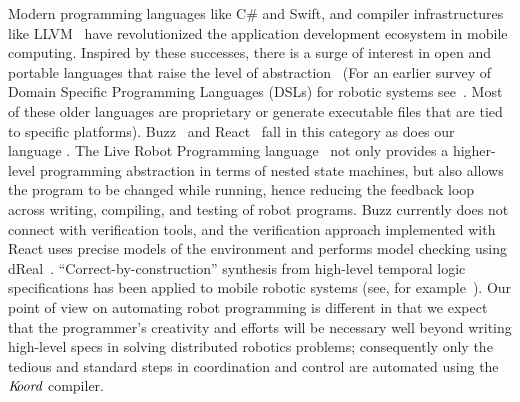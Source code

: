 Modern programming languages like C\# and Swift, and   compiler infrastructures like LLVM~\cite{llvm} have revolutionized the application development ecosystem in mobile computing.
Inspired by these successes, there is a surge of interest in open and portable languages that raise the level of abstraction~\cite{Buzzlanguage,Bohrer:2018:VVC:3192366.3192406,reactlang,williams2003model} (For an earlier survey of Domain Specific Programming Languages (DSLs) for robotic systems see~\cite{Nordmann2014}. Most of these older languages are proprietary or generate executable files that are tied to specific platforms).
%
Buzz~\cite{Buzzlanguage} and React~\cite{reactlang} fall in this category as does our language \lgname.
The Live Robot Programming language~\cite{campusanofabry:lrp2016} not only provides a higher-level programming abstraction in terms of nested state machines, but also allows the program to be changed while running, hence reducing the feedback loop across writing, compiling, and testing of robot programs.
Buzz currently does not  connect with  verification tools, and the verification approach implemented with React uses precise models of the environment and performs model checking using dReal~\cite{Gao2013}.
%
%
%
%
``Correct-by-construction'' synthesis from high-level temporal logic specifications has been applied to mobile robotic systems (see, for example~\cite{kress2009temporal,kloetzer2008fully,wongpiromsarn2010receding,wongpiromsarn2011tulip,ulusoy2013optimality}).
Our point of view on automating robot programming is different in that we expect that the programmer's creativity and efforts will be necessary well beyond writing high-level specs in solving distributed robotics problems; consequently only the tedious and standard steps in coordination and control are automated using the $\emph{K\kern-2pt oord}$ compiler.

